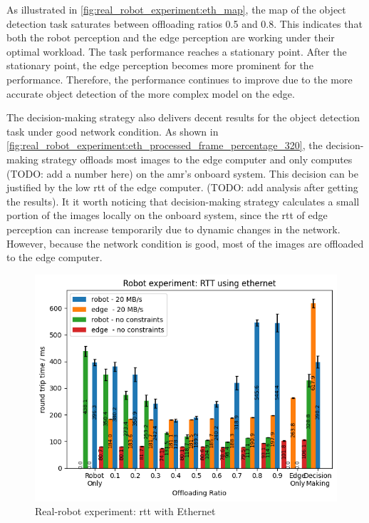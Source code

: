 As illustrated in \cref{fig:real_robot_experiment:eth_map}, the \gls{map} of the object detection task saturates between offloading ratios 0.5 and 0.8. This indicates that both the robot perception and the edge perception are working under their optimal workload. The task performance reaches a stationary point. After the stationary point, the edge perception becomes more prominent for the performance. Therefore, the performance continues to improve due to the more accurate object detection of the more complex model on the edge. 

The decision-making strategy also delivers decent results for the object detection task under good network condition. As shown in \cref{fig:real_robot_experiment:eth_processed_frame_percentage_320}, the decision-making strategy offloads most images to the edge computer and only computes (TODO: add a number here) on the \gls{amr}'s onboard system. This decision can be justified by the low \gls{rtt} of the edge computer. (TODO: add analysis after getting the results). It it worth noticing that decision-making strategy calculates a small portion of the images locally on the onboard system, since the \gls{rtt} of edge perception can increase temporarily due to dynamic changes in the network. However, because the network condition is good, most of the images are offloaded to the edge computer. 

\begin{figure}
    \centering
    \includegraphics[width=\linewidth]{figures/experiment/real_robot/eth/RTT.png}
    \caption{Real-robot experiment: \gls{rtt} with Ethernet}
    \label{fig:real_robot_experiment:eth_rtt}
\end{figure}

